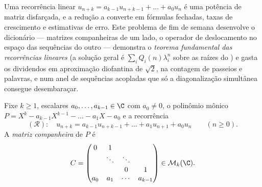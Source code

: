 Uma recorrência linear $u_{n+k} = a_{k-1}u_{n+k-1} + \dots + a_0 u_n$
é uma potência de matriz disfarçada, e a redução a converte em
fórmulas fechadas, taxas de crescimento e estimativas de erro. Este problema
de fim de semana desenvolve o dicionário --- matrizes companheiras de um
lado, o operador de deslocamento no espaço das sequências do outro
--- demonstra o \emph{teorema fundamental das recorrências lineares}
(a solução geral é $\sum_i Q_i(n)\lambda_i^n$ sobre as raízes
do ) e gasta os dividendos em
aproximação diofantina de $\sqrt2$, na contagem de passeios
e palavras, e num anel de sequências acopladas que só a
diagonalização simultânea consegue desembaraçar.

\begin{problem}
\label{pb:b2:reduction:1}
Fixe $k \geq 1$, escalares $a_0, \dots, a_{k-1} \in \C$ com $a_0
\neq 0$, o polinômio mônico $P = X^k - a_{k-1}X^{k-1} - \dots -
a_1 X - a_0$ e a recorrência
\[
(\mathcal R)\colon\quad u_{n+k} = a_{k-1}u_{n+k-1} + \dots +
a_1 u_{n+1} + a_0 u_n \qquad (n \geq 0).
\]
A \emph{matriz companheira} de $P$ é
\[
C =
\begin{pmatrix}
0 & 1 & & \\
 & \ddots & \ddots & \\
 & & 0 & 1\\
a_0 & a_1 & \cdots & a_{k-1}
\end{pmatrix}
\in \mathcal{M}_k(\C).
\]


\end{problem}

